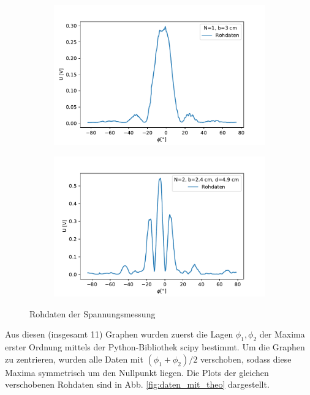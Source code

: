 \documentclass[12pt,a4paper]{article}
\begin{document}
\begin{figure}[H]
	\centering
	\begin{subfigure}{.5\textwidth}
		\centering
		\includegraphics[width=0.9\linewidth]{Rohdaten/Images/einzelspalt_roh_3_3}
	\end{subfigure}%
	\begin{subfigure}{.5\textwidth}
		\centering
		\includegraphics[width=0.9\linewidth]{Rohdaten/Images/doppelspalt_roh_2}
	\end{subfigure}
	\caption{Rohdaten der Spannungsmessung}
	\label{fig:rohdaten}
\end{figure}
Aus diesen (insgesamt 11) Graphen wurden zuerst die Lagen $\phi_1,  \phi_2$ der Maxima erster Ordnung mittels der Python-Bibliothek scipy bestimmt. Um die Graphen zu zentrieren, wurden alle Daten mit $(\phi_1+\phi_2)/2$ verschoben, sodass diese Maxima symmetrisch um den Nullpunkt liegen. Die Plots der gleichen verschobenen Rohdaten sind in Abb. \ref{fig:daten_mit_theo} dargestellt.
\end{document}
